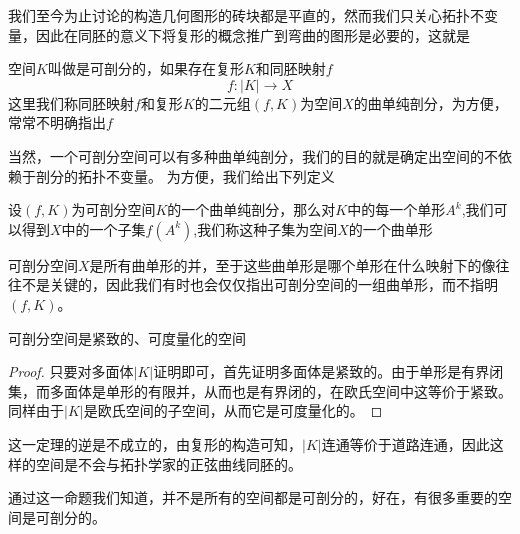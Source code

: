 我们至今为止讨论的构造几何图形的砖块都是平直的，然而我们只关心拓扑不变量，因此在同胚的意义下将复形的概念推广到弯曲的图形是必要的，这就是
\begin{definition}
空间$K$叫做是可剖分的，如果存在复形$K$和同胚映射$f$
\begin{equation*}
    f:|K|\longrightarrow X
\end{equation*}
这里我们称同胚映射$f$和复形$K$的二元组$(f,K)$为空间$X$的曲单纯剖分，为方便，常常不明确指出$f$
\end{definition}
当然，一个可剖分空间可以有多种曲单纯剖分，我们的目的就是确定出空间的不依赖于剖分的拓扑不变量。
为方便，我们给出下列定义
\begin{definition}
设$(f,K)$为可剖分空间$K$的一个曲单纯剖分，那么对$K$中的每一个单形$A^{k}$,我们可以得到$X$中的一个子集$f(A^{k})$,我们称这种子集为空间$X$的一个曲单形
\end{definition}
可剖分空间$X$是所有曲单形的并，至于这些曲单形是哪个单形在什么映射下的像往往不是关键的，因此我们有时也会仅仅指出可剖分空间的一组曲单形，而不指明$(f,K)$。
\begin{proposition}
可剖分空间是紧致的、可度量化的空间
\end{proposition}
\begin{proof}
只要对多面体$|K|$证明即可，首先证明多面体是紧致的。由于单形是有界闭集，而多面体是单形的有限并，从而也是有界闭的，在欧氏空间中这等价于紧致。
同样由于$|K|$是欧氏空间的子空间，从而它是可度量化的。
\end{proof}
\begin{remark}
    这一定理的逆是不成立的，由复形的构造可知，$|K|$连通等价于道路连通，因此这样的空间是不会与拓扑学家的正弦曲线同胚的。
\end{remark}
通过这一命题我们知道，并不是所有的空间都是可剖分的，好在，有很多重要的空间是可剖分的。

